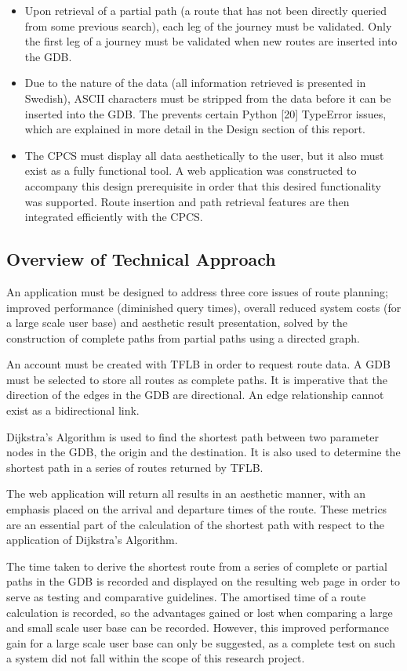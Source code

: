 \documentclass[12pt]{article}   	%
\begin{document}
\begin{itemize}
	\item Upon retrieval of a partial path (a route that has not been directly queried from some previous search), each leg of the journey must be validated. Only the first leg of a journey must be validated when new routes are inserted into the GDB.
	\item Due to the nature of the data (all information retrieved is presented in Swedish), ASCII characters must be stripped from the data before it can be inserted into the GDB. The prevents certain Python [20] TypeError issues, which are explained in more detail in the Design section of this report.
	\item The CPCS must display all data aesthetically to the user, but it also must exist as a fully functional tool. A web application was constructed to accompany this design prerequisite in order that this desired functionality was supported. Route insertion and path retrieval features are then integrated efficiently with the CPCS.
\end{itemize}

\newpage

\subsection{Overview of Technical Approach}
An application must be designed to address three core issues of route planning; improved performance (diminished query times), overall reduced system costs (for a large scale user base) and aesthetic result presentation, solved by the construction of complete paths from partial paths using a directed graph.

An account must be created with TFLB in order to request route data. A GDB must be selected to store all routes as complete paths. It is imperative that the direction of the edges in the GDB are directional. An edge relationship cannot exist as a bidirectional link.

Dijkstra’s Algorithm is used to find the shortest path between two parameter nodes in the GDB, the origin and the destination. It is also used to determine the shortest path in a series of routes returned by TFLB.

The web application will return all results in an aesthetic manner, with an emphasis placed on the arrival and departure times of the route. These metrics are an essential part of the calculation of the shortest path with respect to the application of Dijkstra’s Algorithm.

The time taken to derive the shortest route from a series of complete or partial paths in the GDB is recorded and displayed on the resulting web page in order to serve as testing and comparative guidelines. The amortised time of a route calculation is recorded, so the advantages gained or lost when comparing a large and small scale user base can be recorded. However, this improved performance gain for a large scale user base can only be suggested, as a complete test on such a system did not fall within the scope of this research project.
\end{document}

